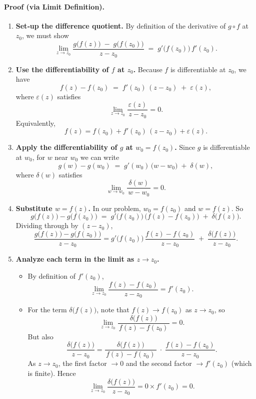 \documentclass[12pt]{article}
\theoremstyle{definition} %
\theoremstyle{plain} %
\begin{document}
\paragraph{Proof (via Limit Definition).}

\begin{enumerate}
\item \textbf{Set‐up the difference quotient.}
By definition of the derivative of $g\circ f$ at $z_0$, we must show
\[
\lim_{z \to z_0} \frac{g\bigl(f(z)\bigr) \;-\; g\bigl(f(z_0)\bigr)}{\,z - z_0\,}
\;=\;
g'\bigl(f(z_0)\bigr)\,f'(z_0).
\]

\item \textbf{Use the differentiability of $f$ at $z_0$.}
Because $f$ is differentiable at $z_0$, we have
\[
f(z) - f(z_0) 
\;=\;
f'(z_0)\,(z - z_0) \;+\; \varepsilon(z),
\]
where $\varepsilon(z)$ satisfies
\[
\lim_{z \to z_0} \frac{\varepsilon(z)}{\,z - z_0\,} = 0.
\]
Equivalently,
\[
f(z) = f(z_0) + f'(z_0)\,(z - z_0) + \varepsilon(z).
\]

\item \textbf{Apply the differentiability of $g$ at $w_0 = f(z_0)$.}
Since $g$ is differentiable at $w_0$, for $w$ near $w_0$ we can write
\[
g(w) - g(w_0) 
\;=\;
g'(w_0)\,\bigl(w - w_0\bigr) \;+\; \delta(w),
\]
where $\delta(w)$ satisfies
\[
\lim_{w \to w_0} \frac{\delta(w)}{\,w - w_0\,} = 0.
\]

\item \textbf{Substitute $w = f(z)$.}
In our problem, $w_0 = f(z_0)$ and $w = f(z)$.  So
\[
g\bigl(f(z)\bigr) - g\bigl(f(z_0)\bigr)
\;=\;
g'\bigl(f(z_0)\bigr)\,\bigl(f(z) - f(z_0)\bigr) 
\;+\;
\delta\bigl(f(z)\bigr).
\]
Dividing through by $(z - z_0)$,
\[
\frac{g\bigl(f(z)\bigr) - g\bigl(f(z_0)\bigr)}{\,z - z_0\,}
=
g'\bigl(f(z_0)\bigr)\,\frac{f(z) - f(z_0)}{\,z - z_0\,}
\;+\;
\frac{\delta\bigl(f(z)\bigr)}{\,z - z_0\,}.
\]

\item \textbf{Analyze each term in the limit as $z \to z_0$.}
\begin{itemize}
\item By definition of $f'(z_0)$,
\[
\lim_{z \to z_0} \frac{f(z) - f(z_0)}{\,z - z_0\,} 
= f'(z_0).
\]
\item For the term $\delta\bigl(f(z)\bigr)$, note that $f(z) \to f(z_0)$ as $z \to z_0$, so
\[
\lim_{z \to z_0} \frac{\delta\bigl(f(z)\bigr)}{\,f(z) - f(z_0)\,} 
= 0.
\]
But also
\[
\frac{\delta\bigl(f(z)\bigr)}{\,z - z_0\,}
=
\frac{\delta\bigl(f(z)\bigr)}{\,f(z) - f(z_0)\,} \;\cdot\; \frac{f(z) - f(z_0)}{\,z - z_0\,}.
\]
As $z \to z_0$, the first factor $\to 0$ and the second factor $\to f'(z_0)$ (which is finite).  
Hence
\[
\lim_{z \to z_0} \frac{\delta\bigl(f(z)\bigr)}{\,z - z_0\,} 
= 0 \times f'(z_0) 
= 0.
\]
\end{itemize}


\end{enumerate}
\end{document}
